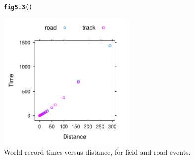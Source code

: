 \documentclass[12pt, a4paper,  BCOR=8.25mm, DIV=15]{scrartcl}\usepackage[]{graphicx}\usepackage[]{color}
\makeatletter
\newcommand{\hlstd}[1]{\textcolor[rgb]{0.345,0.345,0.345}{#1}}%
\newcommand{\hlkwd}[1]{\textcolor[rgb]{0.737,0.353,0.396}{\textbf{#1}}}%
\newenvironment{kframe}{%
 \def\at@end@of@kframe{}%
 \ifinner\ifhmode%
  \def\at@end@of@kframe{\end{minipage}}%
  \begin{minipage}{\columnwidth}%
 \fi\fi%
 \def\FrameCommand##1{\hskip\@totalleftmargin \hskip-\fboxsep
 \colorbox{shadecolor}{##1}\hskip-\fboxsep
     \hskip-\linewidth \hskip-\@totalleftmargin \hskip\columnwidth}%
 \MakeFramed {\advance\hsize-\width
   \@totalleftmargin\z@ \linewidth\hsize
   \@setminipage}}%
 {\par\unskip\endMakeFramed%
 \at@end@of@kframe}
\newenvironment{knitrout}{}{} %
\makeatother
\begin{document}
\begin{figure}
\begin{knitrout}
\color{fgcolor}\begin{kframe}
\begin{alltt}
\hlkwd{fig5.3}\hlstd{()}
\end{alltt}
\end{kframe}

{\centering \includegraphics[width=0.6\textwidth]{figs/glm-fig5_3e-1} 

}



\end{knitrout}
\caption{World record times versus distance, for field and road
  events.\label{fig:wrnolog}}
\end{figure}
\end{document}
